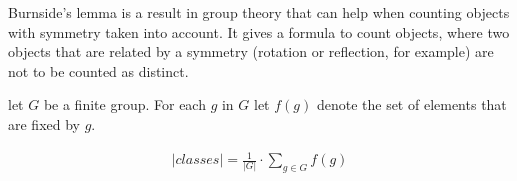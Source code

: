 
Burnside's lemma is a result in group theory that can help when counting objects with symmetry taken into account. It gives a formula to count objects, where two objects that are related by a symmetry (rotation or reflection, for example) are not to be counted as distinct.

let $G$ be a finite group. For each $g$ in $G$ let $f(g)$ denote the set of elements that are fixed by $g$.

\begin{gather*}
  |classes| = \frac{1}{|G|} \cdot \sum_{g \in G} f(g)  
\end{gather*}
